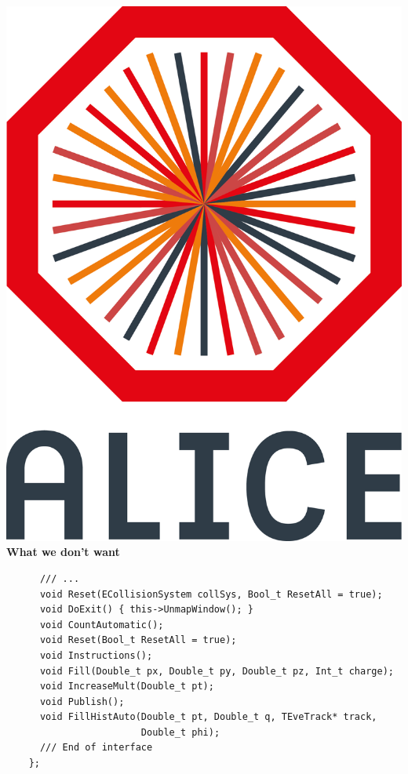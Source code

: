 \documentclass[aspectratio=169,14pt,dvipsnames]{beamer}
\begin{document}
\begin{frame}[fragile]{\includegraphics[height=0.07\textheight]{2012-Jul-04-4_Color_Logo_CB.png} \hspace{0.2cm}\textbf{What we don't want}}
  \begin{verbatim}
      /// ...
      void Reset(ECollisionSystem collSys, Bool_t ResetAll = true);
      void DoExit() { this->UnmapWindow(); }
      void CountAutomatic();
      void Reset(Bool_t ResetAll = true);
      void Instructions();
      void Fill(Double_t px, Double_t py, Double_t pz, Int_t charge);
      void IncreaseMult(Double_t pt);
      void Publish();
      void FillHistAuto(Double_t pt, Double_t q, TEveTrack* track,
                        Double_t phi);
      /// End of interface
    };
  \end{verbatim}
\end{frame}
\end{document}

